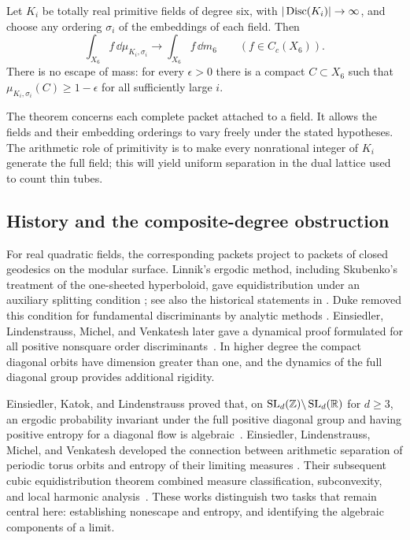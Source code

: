 \begin{theorem}\label{thm:main}
Let $K_i$ be totally real primitive fields of degree six, with
$|\operatorname{Disc}(K_i)|\to\infty$, and choose any ordering $\sigma_i$ of the
embeddings of each field. Then
\[
 \int_{X_6} f\,\dd\mu_{K_i,\sigma_i}
       \longrightarrow\int_{X_6} f\,\dd m_6
       \qquad(f\in C_c(X_6)).
\]
There is no escape of mass: for every $\epsilon>0$ there is a compact
$C\subset X_6$ such that
$\mu_{K_i,\sigma_i}(C)\ge1-\epsilon$ for all sufficiently large $i$.
\end{theorem}

The theorem concerns each complete packet attached to a field. It allows
the fields and their embedding orderings to vary freely under the stated
hypotheses. The arithmetic role of primitivity is to make every
nonrational integer of $K_i$ generate the full field; this will yield
uniform separation in the dual lattice used to count thin tubes.

\subsection{History and the composite-degree obstruction}

For real quadratic fields, the corresponding packets project to packets
of closed geodesics on the modular surface. Linnik's ergodic method,
including Skubenko's treatment of the one-sheeted hyperboloid, gave
equidistribution under an auxiliary splitting condition
\cite[Chapter~VI]{Linnik1968}; see also the historical statements in
\cite[Theorems~1.1--1.2]{ELMV2012}. Duke removed this condition for
fundamental discriminants by analytic methods
\cite[Theorem~1]{Duke1988}. Einsiedler, Lindenstrauss, Michel, and
Venkatesh later gave a dynamical proof formulated for all positive
nonsquare order discriminants~\cite[Theorem~2.3]{ELMV2012}.
In higher degree the compact diagonal orbits have dimension greater
than one, and the dynamics of the full diagonal group provides
additional rigidity.

Einsiedler, Katok, and Lindenstrauss proved that, on
$\operatorname{SL}_d(\mathbb Z)\backslash\operatorname{SL}_d(\mathbb R)$ for $d\ge3$, an ergodic probability
invariant under the full positive diagonal group and having positive
entropy for a diagonal flow is algebraic~\cite[Theorem~1.3]{EKL2006}.
Einsiedler, Lindenstrauss, Michel,
and Venkatesh developed the connection between arithmetic separation of
periodic torus orbits and entropy of their limiting measures
\cite{ELMV2009}. Their subsequent cubic equidistribution theorem
combined measure classification, subconvexity, and local harmonic
analysis~\cite{ELMV2011}. These works distinguish two tasks that remain
central here: establishing nonescape and entropy, and identifying the
algebraic components of a limit.

